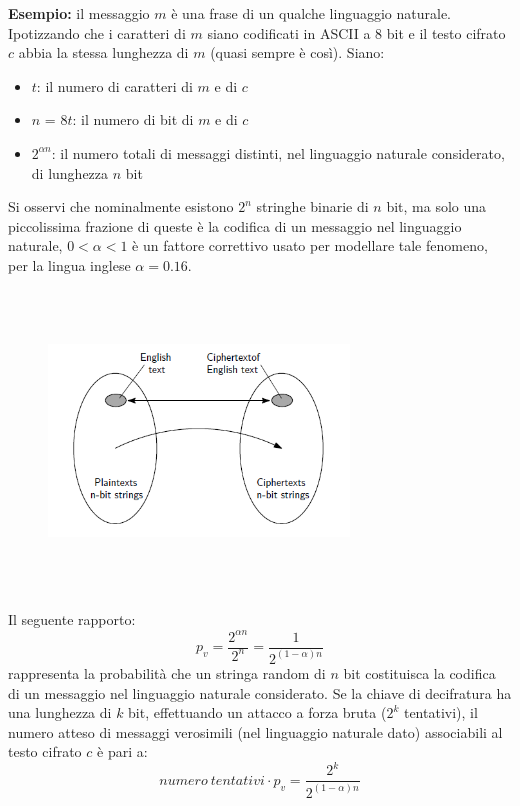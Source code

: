 \textbf{Esempio:} il messaggio $m$ è una frase di un qualche linguaggio naturale. Ipotizzando che i caratteri di $m$ siano codificati in ASCII a 8 bit e il testo cifrato $c$ abbia la stessa lunghezza di $m$ (quasi sempre è così). Siano:
\begin{itemize} 
  \item $t$: il numero di caratteri di $m$ e di $c$
  \item $n$ = $8t$: il numero di bit di $m$ e di $c$
  \item $2^{\alpha n}$: il numero totali di messaggi distinti, nel linguaggio naturale considerato, di lunghezza $n$ bit
\end{itemize}
Si osservi che nominalmente esistono $2^n$ stringhe binarie di $n$ bit, ma solo una piccolissima frazione di queste è la codifica di un messaggio nel linguaggio naturale, $0 < \alpha < 1$ è un fattore correttivo usato per modellare tale fenomeno, per la lingua inglese $\alpha = 0.16$.
\begin{figure}[htbp]
	\centering%
	\subfigure%
	{\includegraphics[height=8cm, width=8cm, keepaspectratio]{Immagini/introduzione/attacco_solo_tc.png}}
\end{figure}
\newline
Il seguente rapporto:
\begin{equation}
p_{v} = \frac{2^{\alpha n}}{2^n} = \frac{1}{2^{(1 - \alpha)n}}
\end{equation}
rappresenta la probabilità che un stringa random di $n$ bit costituisca la codifica di un messaggio nel linguaggio naturale considerato. Se la chiave di decifratura ha una lunghezza di $k$ bit, effettuando un attacco a forza bruta ($2^k$ tentativi), il numero atteso di messaggi verosimili (nel linguaggio naturale dato) associabili al testo cifrato $c$ è pari a:
\begin{equation}
numero \: tentativi  \cdot p_{v} = \frac{2^k}{2^{(1 - \alpha)n}}
\end{equation}
